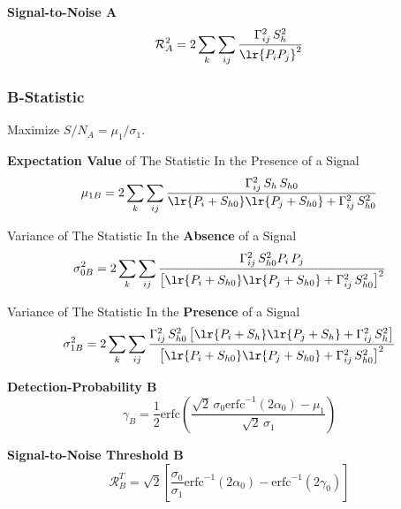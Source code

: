 \documentclass[10pt, oneside, onecolumn]{article}   	%
\newcommand\erfc[1]{\mathrm{erfc}\left(#1\right)}
\newcommand\erfcinv[1]{\mathrm{erfc}^{-1}\left(#1\right)}
\newcommand\snr{\mathcal{R}}
\newcommand\pulsarsum{\sum_k \sum_{ij}}
\begin{document}
        \noindent \textbf{Signal-to-Noise A}
        \begin{equation}
        \label{eq:snr_a}
        \snr_A^2 = 2 \pulsarsum \frac{\Gamma_{ij}^2 \, S_h^2}{\lr{P_i P_j}^2}
        \end{equation}

        \subsubsection{B-Statistic}
        Maximize $S/N_A = \mu_1 / \sigma_1$.

        \noindent \textbf{Expectation Value} of The Statistic In the Presence of a Signal
        \begin{equation}
        \mu_{1B} = 2 \pulsarsum \frac{\Gamma_{ij}^2 \, S_h \, S_{h0}}{\lr{P_i + S_{h0}} \lr{P_j + S_{h0}} + \Gamma_{ij}^2 \, S_{h0}^2}
        \end{equation}

        \noindent Variance of The Statistic In the \textbf{Absence} of a Signal
        \begin{equation}
        \sigma_{0B}^2 = 2 \pulsarsum \frac{\Gamma_{ij}^2 \, S_{h0}^2 P_i \, P_j}{\left[{\lr{P_i + S_{h0}} \lr{P_j + S_{h0}} + \Gamma_{ij}^2 \, S_{h0}^2}\right]^2}
        \end{equation}

        \noindent Variance of The Statistic In the \textbf{Presence} of a Signal
        \begin{equation}
        \sigma_{1B}^2 = 2 \pulsarsum \frac{\Gamma_{ij}^2 \, S_{h0}^2 \left[ \lr{P_i + S_h} \lr{P_j + S_h} + \Gamma_{ij}^2 \, S_h^2\right]}{\left[{\lr{P_i + S_{h0}} \lr{P_j + S_{h0}} + \Gamma_{ij}^2 \, S_{h0}^2}\right]^2}
        \end{equation}

        \noindent \textbf{Detection-Probability B}
        \begin{equation}
        \gamma_B = \frac{1}{2} \erfc{ \frac{\sqrt{2} \, \sigma_0 \erfcinv{2\alpha_0} - \mu_1}{\sqrt{2} \, \sigma_1} }
        \end{equation}

        \noindent \textbf{Signal-to-Noise Threshold B}
        \begin{equation}
        \label{eq:snr_thresh_b}
        \snr_B^T = \sqrt{2} \left[ \frac{\sigma_0}{\sigma_1} \erfcinv{2\alpha_0} - \erfcinv{2\gamma_0} \right]
        \end{equation}
\end{document}
